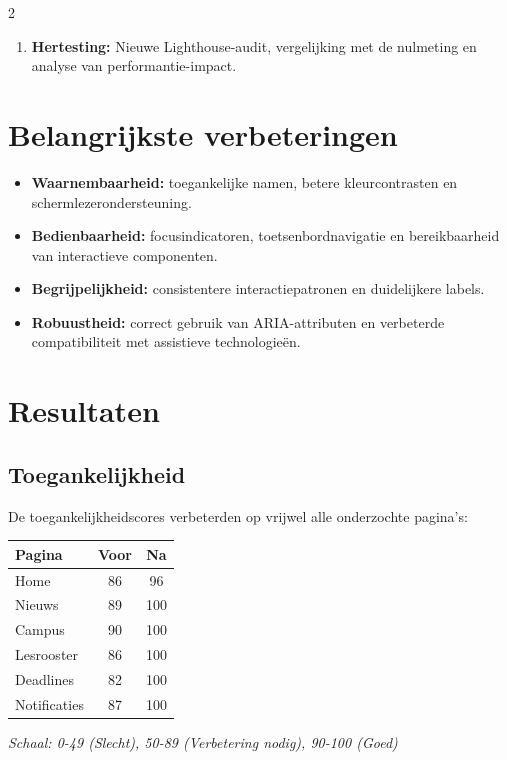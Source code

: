 \documentclass[a0,portrait]{hogent-poster}
\begin{document}
\begin{multicols}{2}
\begin{enumerate}
    \item \textbf{Hertesting:} Nieuwe Lighthouse-audit, vergelijking met de nulmeting en analyse van performantie-impact.
\end{enumerate}

\section{Belangrijkste verbeteringen}

\begin{itemize}
    \item \textbf{Waarnembaarheid:} toegankelijke namen, betere kleurcontrasten en schermlezerondersteuning.
    \item \textbf{Bedienbaarheid:} focusindicatoren, toetsenbordnavigatie en bereikbaarheid van interactieve componenten.
    \item \textbf{Begrijpelijkheid:} consistentere interactiepatronen en duidelijkere labels.
    \item \textbf{Robuustheid:} correct gebruik van ARIA-attributen en verbeterde compatibiliteit met assistieve technologieën.
\end{itemize}

\section{Resultaten}
\subsection{Toegankelijkheid}

De toegankelijkheidscores verbeterden op vrijwel alle onderzochte pagina's:

\begin{center}
\begin{tabular}{l c c}
\textbf{Pagina} & \textbf{Voor} & \textbf{Na} \\
\hline
Home & 86 & 96 \\
Nieuws & 89 & 100 \\
Campus & 90 & 100 \\
Lesrooster & 86 & 100 \\
Deadlines & 82 & 100 \\
Notificaties & 87 & 100 \\
\end{tabular}

\textit{Schaal: 0-49 (Slecht), 50-89 (Verbetering nodig), 90-100 (Goed)}
\end{center}


\end{multicols}
\end{document}
